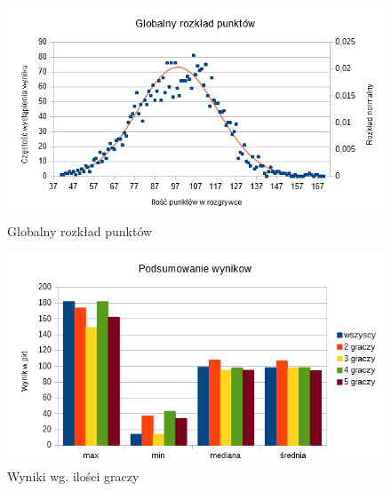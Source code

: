 \documentclass[12pt, oneside]{report}
\begin{document}
\begin{figure}
	\includegraphics[height=0.45\textheight,width=\textwidth]{GaussWykrespunktowglobal.png}
	\caption{Globalny rozkład punktów}
	\label{figure:global_points_algo}
\end{figure}

\begin{figure}
	\includegraphics[height=0.45\textheight,width=\textwidth]{WynikWPkt.png}
	\caption{Wyniki wg. ilości graczy}
	\label{figure:min_max_algo}
\end{figure}
\end{document}
